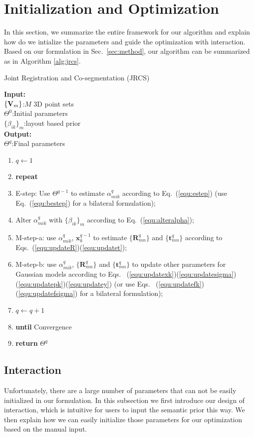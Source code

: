 \section{Initialization and Optimization}
\label{sec:imp}
In this section, we summarize the entire framework for our algorithm and explain how do we intialize the parameters and guide the optimization with interaction.  
%
Based on our formulation in Sec.~\ref{sec:method}, our algorithm can be summarized as in Algorithm \ref{alg:jrcs}.
\begin{algorithm}[htb]
	\caption{Joint Registration and Co-segmentation (JRCS)}
	\label{alg:jrcs}
	\textbf{Input:}~~\\
	$\{\mathbf{V}_m\}$:$M$ 3D point sets\\
	$\Theta^0$:Initial parameters\\
	$\{\beta_{ik}\}_{m}$:layout based prior\\
	\textbf{Output:}~~\\
	$\Theta^q$:Final parameters~~
	\begin{enumerate}
		\item $q\leftarrow1$
		\item \textbf{repeat}
		\item E-step: Use $\Theta^{q-1}$ to estimate $\alpha_{mik}^q$ according to Eq.~(\ref{equ:estep}) (use Eq.~(\ref{equ:bestep}) for a bilateral formulation);
		\item Alter $\alpha_{mik}^q$ with $\{\beta_{ik}\}_{m}$ according to Eq.~(\ref{equ:alteralpha});
		\item M-step-a: use $\alpha^q_{mik}$, $\mathbf x^{q-1}_k$ to estimate $\{\mathbf{R}_{mn}^q\}$ and $\{\mathbf t_{mn}^q\}$ according to Eqs.~(\ref{equ:updateR})(\ref{equ:updatet});
		\item M-step-b: use $\alpha^q_{mik}$, $\{\mathbf{R}_{mn}^q\}$ and $\{\mathbf{t}_{mn}^q\}$ to update other parameters for Gaussian models according to Eqs.~ (\ref{equ:updatexk})(\ref{equ:updatesigma})(\ref{equ:updatepk})(\ref{equ:updatey})  (or use Eqs.~ (\ref{equ:updatefk})(\ref{equ:updatefsigma}) for a bilateral formulation);
		\item $q \leftarrow q+1$
		\item \textbf{until} Convergence 
		\item \textbf{return} $\Theta^q$
	\end{enumerate}
\end{algorithm}

\subsection{Interaction}
\label{sec:imp:interact}
Unfortunately, there are a large number of parameters that can not be easily initialized in our formulation. 
%
In this subsection we first introduce our design of interaction, which is intuitive for users to input the semantic prior this way. We then explain how we can easily initialize those parameters for our optimization based on the manual input.



